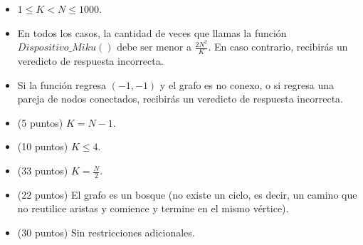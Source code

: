 \documentclass[12pt]{scrartcl}
\begin{document}
        \begin{itemize}
            \item $1 \le K < N \le 1000$.
            \item En todos los casos, la cantidad de veces que llamas la función $Dispositivo\_Miku()$ debe ser menor a $\frac{2N^2}{K}$. En caso contrario, recibirás un veredicto de respuesta incorrecta.
            \item Si la función regresa $(-1, -1)$ y el grafo es no conexo, o si regresa una pareja de nodos conectados, recibirás un veredicto de respuesta incorrecta.
        \end{itemize}
    

    \begin{itemize}
        \item (5 puntos) $K = N - 1$.
        \item (10 puntos) $K \le 4$.
        \item (33 puntos) $K = \frac{N}{2}$.
        \item (22 puntos) El grafo es un bosque (no existe un ciclo, es decir, un camino que no reutilice aristas y comience y termine en el mismo vértice).
        \item (30 puntos) Sin restricciones adicionales.
    \end{itemize}
\end{document}
